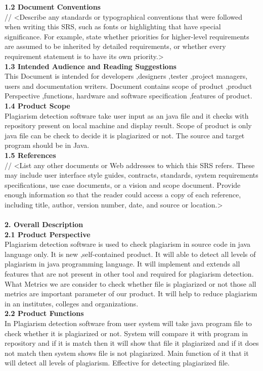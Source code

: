 \textbf{1.2	Document Conventions}\\
// <Describe any standards or typographical conventions that were followed when writing this SRS, such as fonts or highlighting that have special significance. For example, state whether priorities  for higher-level requirements are assumed to be inherited by detailed requirements, or whether every requirement statement is to have its own priority.>\\
\textbf{1.3	Intended Audience and Reading Suggestions}\\
This Document is intended for developers ,designers ,tester ,project managers, users and documentation writers. Document contains scope of product ,product Perspective ,functions, hardware and software specification ,features of product.\\
\textbf{1.4	Product Scope}\\
Plagiarism detection software take user input as an java file and it checks  with  repository present on local machine and display result. Scope  of product is only java file can be check to decide it  is plagiarized or not. The source  and target program should be in Java.\\
\textbf{1.5	References}\\
// 
<List any other documents or Web addresses to which this SRS refers. These may include user interface style guides, contracts, standards, system requirements specifications, use case documents, or a vision and scope document. Provide enough information so that the reader could access a copy of each reference, including title, author, version number, date, and source or location.>\\\\
\textbf{2.	Overall Description}\\
\textbf{2.1	Product Perspective}\\
Plagiarism detection software is used to check plagiarism in source code in java language only. It is new ,self-contained product. It will able to detect all levels of plagiarism in java programming language. It will implement and extends all features that are not present in other tool and required for plagiarism detection. What Metrics we are  consider to check whether file is plagiarized or not those all metrics are important parameter of our product.  It will help to reduce plagiarism in an institutes, colleges and organizations.\\
\textbf{2.2	Product Functions}\\
In Plagiarism detection software from user system will take java program file to check whether it is plagiarized or not. System will compare it with program in repository and if it is match then it will show that file it plagiarized and if it does not match then system shows file is not plagiarized. Main function of it that it will detect all levels of plagiarism. Effective for detecting plagiarized file. \\
